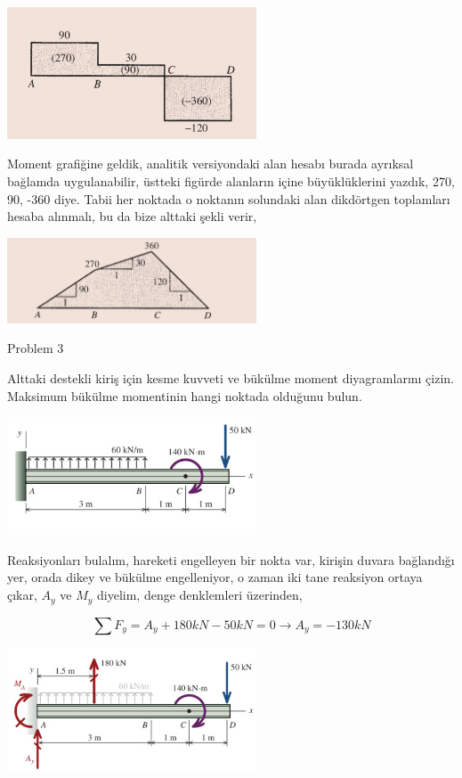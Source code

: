 \documentclass[12pt,fleqn]{article}\usepackage{../../common}
\begin{document}
\includegraphics[width=20em]{phy_020_strs_02_17.jpg}

Moment grafiğine geldik, analitik versiyondaki alan hesabı burada ayrıksal
bağlamda uygulanabilir, üstteki figürde alanların içine büyüklüklerini yazdık,
270, 90, -360 diye. Tabii her noktada o noktanın solundaki alan dikdörtgen
toplamları hesaba alınmalı, bu da bize alttaki şekli verir,

\includegraphics[width=20em]{phy_020_strs_02_18.jpg}

Problem 3

Alttaki destekli kiriş için kesme kuvveti ve bükülme moment diyagramlarını
çizin. Maksimum bükülme momentinin hangi noktada olduğunu bulun.

\includegraphics[width=20em]{phy_020_strs_02_19.jpg}

Reaksiyonları bulalım, hareketi engelleyen bir nokta var, kirişin duvara
bağlandığı yer, orada dikey ve bükülme engelleniyor, o zaman iki tane reaksiyon
ortaya çıkar, $A_y$ ve $M_y$ diyelim, denge denklemleri üzerinden,

$$
\sum F_y = A_y + 180 kN - 50 kN = 0 \to A_y = -130 kN
$$

\includegraphics[width=20em]{phy_020_strs_02_20.jpg}
\end{document}
